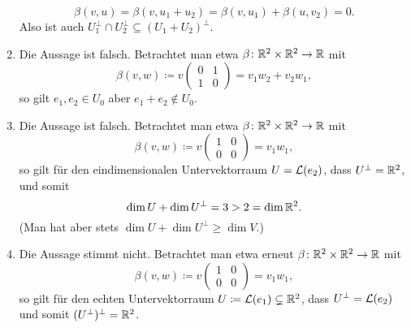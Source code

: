 \documentclass[a4paper, 10pt]{scrartcl}
\begin{document}
\begin{solution}
\begin{enumerate}[leftmargin=*]
      \[
          \beta(v, u)
        = \beta(v, u_1 + u_2)
        = \beta(v, u_1) + \beta(u, v_2)
        = 0.
      \]
      Also ist auch $U_1^\perp \cap U_2^\perp \subseteq (U_1 + U_2)^\perp$.
    \item
      Die Aussage ist falsch.
      Betrachtet man etwa $\beta \colon \mathbb{R}^2 \times \mathbb{R}^2 \to \mathbb{R}$ mit
      \[
                  \beta(v, w)
        \coloneqq v \begin{pmatrix} 0 & 1 \\ 1 & 0 \end{pmatrix}
        =         v_1 w_2 + v_2 w_1,
      \]
      so gilt $e_1, e_2 \in U_0$ aber $e_1 + e_2 \notin U_0$.
    \item
      Die Aussage ist falsch.
      Betrachtet man etwa $\beta \colon \mathbb{R}^2 \times \mathbb{R}^2 \to \mathbb{R}$ mit
      \[
                  \beta(v, w)
        \coloneqq v \begin{pmatrix} 1 & 0 \\ 0 & 0 \end{pmatrix}
        =         v_1 w_1,
      \]
      so gilt für den eindimensionalen Untervektorraum $U = \mathcal{L}(e_2)$, dass $U^\perp = \mathbb{R}^2$, und somit
      \[
        \dim U + \dim U^\perp = 3 > 2 = \dim \mathbb{R}^2.
      \]
      (Man hat aber stets $\dim U + \dim U^\perp \geq \dim V$.)
    \item
      Die Aussage stimmt nicht.
      Betrachtet man etwa erneut $\beta \colon \mathbb{R}^2 \times \mathbb{R}^2 \to \mathbb{R}$ mit
      \[
                  \beta(v, w)
        \coloneqq v \begin{pmatrix} 1 & 0 \\ 0 & 0 \end{pmatrix}
        =         v_1 w_1,
      \]
      so gilt für den echten Untervektorraum $U \coloneqq \mathcal{L}(e_1) \subsetneq \mathbb{R}^2$, dass $U^\perp = \mathcal{L}(e_2)$ und somit $(U^\perp)^\perp = \mathbb{R}^2$.
  \end{enumerate}
\end{solution}
\end{document}
